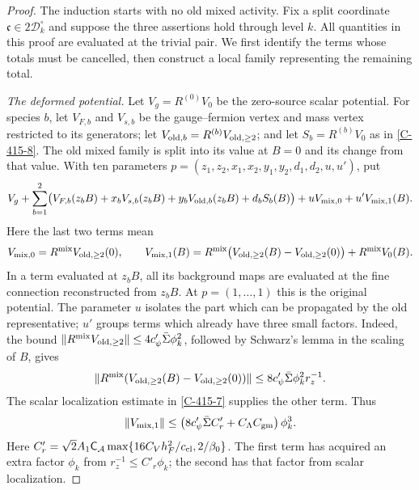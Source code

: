 \documentclass[11pt,letterpaper,reqno]{amsart}
\theoremstyle{definition}
\theoremstyle{remark}
\begin{document}
\begin{proof}
The induction starts with no old mixed activity.  Fix a split
coordinate $\mathfrak c\in2\mathscr D_k^\circ$ and suppose the
three assertions hold through level $k$.  All quantities in this
proof are evaluated at the trivial pair.  We first identify the
terms whose totals must be cancelled, then construct a local
family representing the remaining total.

\emph{The deformed potential.}
Let $V_g=R^{(0)}V_0$ be the zero-source scalar potential.
For species $b$, let $V_{F,b}$ and $V_{s,b}$ be the
gauge--fermion vertex and mass vertex restricted to its
generators; let $V_{{\rm old},b}=R^{(b)}V_{{\rm old},\ge2}$;
and let $S_b=R^{(b)}V_0$ as in \cref{C-415-8}.
The old mixed family is split into its value at $B=0$
and its change from that value.  With ten parameters
$p=(z_1,z_2,x_1,x_2,y_1,y_2,d_1,d_2,u,u')$, put
\begin{align*}
 V_g+\sum_{b=1}^2\bigl(
  V_{F,b}(z_bB)+x_bV_{s,b}(z_bB)
       +y_bV_{{\rm old},b}(z_bB)+d_bS_b(B)\bigr)
       +uV_{{\rm mix},0}+u'V_{{\rm mix},1}(B).
\end{align*}
Here the last two terms mean
\[
 V_{{\rm mix},0}=R^{\rm mix}V_{{\rm old},\ge2}(0),\qquad
 V_{{\rm mix},1}(B)
 =R^{\rm mix}\bigl(V_{{\rm old},\ge2}(B)
                       -V_{{\rm old},\ge2}(0)\bigr)
                         +R^{\rm mix}V_0(B).
\]
In a term evaluated at $z_bB$, all its background maps
are evaluated at the fine connection reconstructed from
$z_bB$.  At $p=(1,\ldots,1)$ this is the original potential.
The parameter $u$ isolates the part which can be propagated
by the old representative; $u'$ groups terms which already
have three small factors.  Indeed, the bound
$\|R^{\rm mix}V_{{\rm old},\ge2}\|
\le4c'_\psi\bar\Sigma\phi_k^2$, followed by Schwarz's lemma
in the scaling of $B$, gives
\[
 \|R^{\rm mix}(V_{{\rm old},\ge2}(B)
                       -V_{{\rm old},\ge2}(0))\|
       \le8c'_\psi\bar\Sigma\phi_k^2r_z^{-1}.
\]
The scalar localization estimate in \cref{C-415-7}
supplies the other term.  Thus
\[
 \|V_{{\rm mix},1}\|
 \le \left(8c'_\psi\bar\Sigma C'_r
             +C_\Lambda C_{\rm gm}\right)\phi_k^3.
\]
Here
$C'_r=\sqrt2A_1\mathsf C_{\mathcal A}
\max\{16C_Vh_F^2/c_{\rm cl},2/\beta_0\}$.
The first term has acquired an extra factor $\phi_k$
from $r_z^{-1}\le C'_r\phi_k$; the second has that factor
from scalar localization.


\end{proof}
\end{document}
